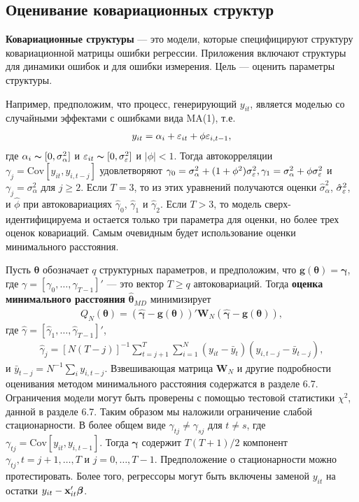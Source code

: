 \subsection{Оценивание ковариационных структур}

\textbf{Ковариационные структуры} --- это модели, которые специфицируют структуру ковариационной матрицы ошибки регрессии. Приложения включают структуры для динамики ошибок и для ошибки измерения. Цель --- оценить параметры структуры.

Например, предположим, что процесс, генерирующий $y_{it}$, является моделью со случайными эффектами с ошибками вида MA(1), т.е.
\begin{align}
y_{it}=\alpha_i+\varepsilon_{it}+\phi \varepsilon_{i,t-1},
\nonumber
\end{align}
где $\alpha_i \thicksim [0, \sigma^2_{\alpha}]$ и $\varepsilon_{it} \thicksim [0, \sigma^2_\varepsilon]$ и $|\phi| <1$. Тогда автокорреляции $\gamma_j=\mathrm{Cov}[y_{it}, y_{i,t-j}]$ удовлетворяют $\gamma_0=\sigma^2_{\alpha}+(1+\phi^2)\sigma^2_\varepsilon, \gamma_1=\sigma^2_{\alpha}+\phi \sigma^2_{\varepsilon}$ и $\gamma_j=\sigma^2_{\alpha}$ для $j \geq 2$. Если $T=3$, то из этих уравнений получаются оценки $\hat{\sigma}^2_{\alpha}$,  $\hat{\sigma}^2_{\varepsilon}$, и $\hat{\phi}$ при автоковариациях $\hat{\gamma}_0$, $\hat{\gamma}_1$ и $\hat{\gamma}_2$. Если $T>3$, то модель сверх-идентифицируема и остается только три параметра для оценки, но более трех оценок ковариаций. Самым очевидным будет использование оценки минимального расстояния.

Пусть $\bm\theta$ обозначает $q$  структурных параметров, и предположим, что $\mathbf{g}(\bm\theta)=\bm\gamma$, где $\gamma=[\gamma_0, \dots, \gamma_{T-1}]'$ --- это вектор $T \geq q$ автоковариаций. Тогда \textbf{оценка минимального расстояния} $\hat{\bm\theta}_{MD}$ минимизирует
\begin{align}
Q_N(\bm\theta)=(\hat{\bm\gamma}-\mathbf{g}(\bm\theta))'\mathbf{W}_N (\hat{\bm\gamma}-\mathbf{g}(\bm\theta)),
\label{Eq:22.37}
\end{align}
где $\hat{\gamma}=[\hat{\gamma}_1, \dots, \hat{\gamma}_{T-1}]'$,
\begin{align}
\hat{\gamma}_j=[N(T-j)]^{-1} \sum^T_{t=j+1} \sum^N_{i=1} (y_{it}-\bar{y}_t)(y_{i,t-j}-\bar{y}_{t-j}),
\label{Eq:22.38}
\end{align}
и $\bar{y}_{t-j}=N^{-1} \sum_i y_{i,t-j}$. Взвешивающая матрица $\mathbf{W}_N$ и другие подробности  оценивания методом минимального расстояния содержатся в разделе 6.7. Ограничения модели могут быть проверены с помощью тестовой статистики $\chi^2$, данной в разделе 6.7. Таким образом мы наложили  ограничение слабой стационарности. В более общем виде
$\gamma_{tj} \neq \gamma_{sj}$ для $t \neq s$, где  $\gamma_{tj}=\mathrm{Cov}[y_{it},y_{i,t-1}]$. Тогда $\bm\gamma$ содержит $T(T+1)/2$ компонент $\gamma_{tj}, t= j+1, \dots, T$ и $j=0, \dots, T-1$. Предположение о стационарности  можно протестировать. Более того, регрессоры могут быть включены заменой $y_{it}$ на остатки $y_{it}-\mathbf{x}'_{it} \bm{\beta}$.

